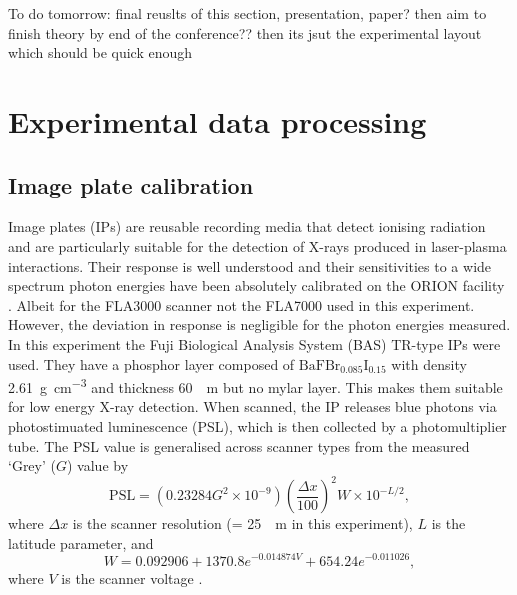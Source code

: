 

To do tomorrow: final reuslts of this section, presentation, paper? then aim to finish theory by end of the conference?? then its jsut the experimental layout which should be quick enough

\section{\label{ch:3-sec:data_processing}Experimental data processing}

\subsection{Image plate calibration}
Image plates (IPs) are reusable recording media that detect ionising radiation and are particularly suitable for the detection of X-rays produced in laser-plasma interactions. Their response is well understood and their sensitivities to a wide spectrum photon energies have been absolutely calibrated on the ORION facility \cite{meadowcroftEvaluationSensitivityFading2008}. Albeit for the FLA3000 scanner not the FLA7000 used in this experiment. However, the deviation in response is negligible for the photon energies measured. In this experiment the Fuji Biological Analysis System (BAS) TR-type IPs were used. They have a phosphor layer composed of $\mathrm{BaFBr_{0.085}I_{0.15}}$ with density \qty{2.61}{g.cm^{-3}} and thickness \qty{60}{\mu m} but no mylar layer. This makes them suitable for low energy X-ray detection. When scanned, the IP releases blue photons via photostimuated luminescence (PSL), which is then collected by a photomultiplier tube. The PSL value is generalised across scanner types from the measured `Grey' ($G$) value by
\begin{equation}
	\mathrm{PSL} = (0.23284G^2\times 10^{-9})\left(\frac{\Delta x}{100}\right)^2W\times 10^{-L/2},
\end{equation}
where $\Delta x$ is the scanner resolution (= \qty{25}{\mu m} in this experiment), $L$ is the latitude parameter, and
\begin{equation}
	W = 0.092906 + 1370.8e^{-0.014874V} +  654.24e^{-0.011026},
\end{equation}
where $V$ is the scanner voltage \cite{golovinCalibrationImagingPlates2021}.

